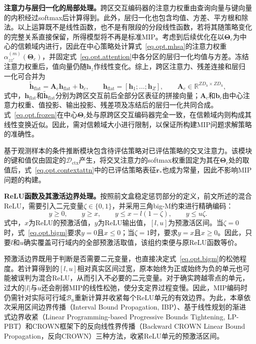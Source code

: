 \textbf{注意力与层归一化的局部处理。}跨区交互编码器的注意力权重由查询向量与键向量的内积经过softmax后计算得到。此外，层归一化也包含均值、方差、平方根和除法。以上运算既不是线性函数，也不是有限段的分段线性函数，若将其随策略变化的完整关系直接保留，所得模型将不再是标准MIP。考虑到后续优化在以$\bm{\Theta}_{c}$为中心的信赖域内进行，因此在中心策略处计算式~\eqref{eq.opt.mhsa}的注意力权重$\alpha_{zz'}^{(m)}(\bm{\Theta}_{c})$，并固定式~\eqref{eq.opt.attention}中各分区的层归一化均值与方差。冻结注意力权重后，值向量仍随$\bm h_z$作线性变化。综上，跨区注意力、残差连接和层归一化可合并为
\begin{equation}
\tilde{\bm{h}}_{\mathrm{flat}}
=\bm{A}_{c}\bm{h}_{\mathrm{flat}}+\bm{b}_{c},
\qquad
\bm{h}_{\mathrm{flat}}
=\left[\bm{h}_{1};\ldots;\bm{h}_{Z}\right],
\qquad
\bm{A}_{c}\in\mathbb{R}^{ZD_h\times ZD_h},
\label{eq.opt.frozen}
\end{equation}
式中，$\bm h_{\mathrm{flat}}$和$\tilde{\bm h}_{\mathrm{flat}}$分别为跨区交互前后全部分区表征的拼接向量；$\bm A_c$和$\bm b_c$由中心注意力权重、值投影、输出投影、残差项及冻结后的层归一化共同合成。式~\eqref{eq.opt.frozen}在中心$\bm{\Theta}_{c}$处与原跨区交互编码器完全一致，在信赖域内则构成其线性变换近似。因此，需对信赖域大小进行限制，以保证所构建MIP问题求解策略的准确性。

基于观测样本的条件推断模块包含待评估策略对已评估策略的交叉注意力。该模块的键和值仅由固定的$\mathcal D_{\mathrm{ctx}}$产生，将交叉注意力的softmax权重固定为其在$\bm\Theta_c$处的取值后，式~\eqref{eq.opt.contextattn}中的已评估策略表征$\bm r_*$也成为常量，因此不影响MIP问题的构建。

\textbf{ReLU函数及其激活边界处理。}按照前文盒稳定惩罚部分的定义，前文所述的混合ReLU，需要引入二元变量$\zeta\in\{0,1\}$，并采用三角big-M约束进行精确编码\citep{tjengEVALUATINGROBUSTNESSNEURAL2019}：
\begin{equation}
y\geq0,\qquad
y\geq x,\qquad
y\leq x-l(1-\zeta),\qquad
y\leq u\zeta.
\label{eq.opt.bigm}
\end{equation}
式中，$x$为ReLU的预激活值，$y$为ReLU输出值，$[l,u]$为预激活区间。当$\zeta=0$时，式~\eqref{eq.opt.bigm}要求$y=0$且$x\leq0$；当$\zeta=1$时，要求$y=x$且$x\geq0$。因此，只要$l$和$u$确实覆盖可行域内的全部预激活取值，该组约束便与原ReLU函数等价。

预激活边界既用于判断是否需要二元变量，也直接决定式~\eqref{eq.opt.bigm}的松弛程度。若计算得到的$[l,u]$相对真实区间过宽，原本始终为正或始终为负的单元也可能被误判为混合ReLU，从而引入不必要的二元变量。对于确实跨越零点的单元，过大的$|l|$与$u$还会削弱MIP的线性松弛，使分支定界过程变慢。因此，MIP编码时仍需针对实际可行域$\mathcal B_{\mathrm n}$重新计算并收紧每个ReLU单元的有效边界。为此，本章依次采用区间边界传播（Interval Bound Propagation, IBP）\citep{gowalScalableVerifiedTraining2019}、基于线性规划的渐进式边界收紧（Linear Programming-based Progressive Bounds Tightening, LP-PBT）\citep{tjengEVALUATINGROBUSTNESSNEURAL2019}和CROWN框架下的反向线性界传播（Backward CROWN Linear Bound Propagation，反向CROWN）\citep{zhangEfficientNeuralNetwork2018}三种方法，收紧ReLU单元的预激活区间。

